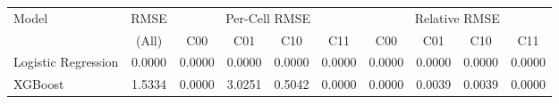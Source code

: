 \begin{tabular}{l c cccc cccc}
\toprule
Model & RMSE & \multicolumn{4}{c}{Per-Cell RMSE} & \multicolumn{4}{c}{Relative RMSE} \\
 & (All) & C00 & C01 & C10 & C11 & C00 & C01 & C10 & C11 \\
\midrule
Logistic Regression & 0.0000 & 0.0000 & 0.0000 & 0.0000 & 0.0000 & 0.0000 & 0.0000 & 0.0000 & 0.0000 \\
XGBoost & 1.5334 & 0.0000 & 3.0251 & 0.5042 & 0.0000 & 0.0000 & 0.0039 & 0.0039 & 0.0000 \\
\bottomrule
\end{tabular}
